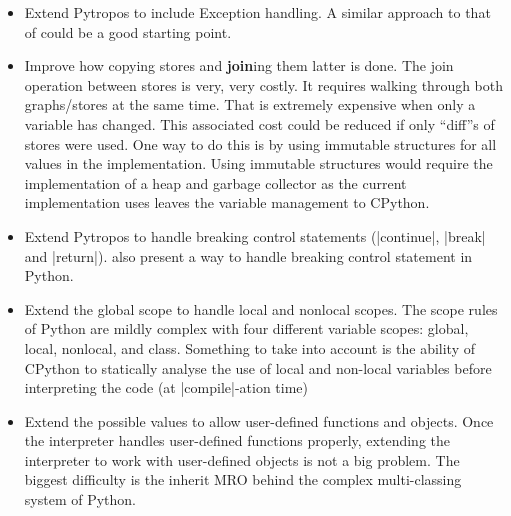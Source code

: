 \begin{itemize}
\tightlist
\item Extend Pytropos to include Exception handling. A similar approach to that of
  \textcite{fromherz_static_2018} could be a good starting point.
\item Improve how copying stores and \textbf{join}ing them latter is done. The join
  operation between stores is very, very costly. It requires walking through both
  graphs/stores at the same time. That is extremely expensive when only a variable has
  changed. This associated cost could be reduced if only \enquote{diff}s of stores were
  used.  One way to do this is by using immutable structures for all values in the
  implementation. Using immutable structures would require the implementation of a heap
  and garbage collector as the current implementation uses leaves the variable management
  to CPython.
\item Extend Pytropos to handle breaking control statements (\pycode|continue|,
  \pycode|break| and \pycode|return|). \textcite{fromherz_static_2018} also present a way
  to handle breaking control statement in Python.
\item Extend the global scope to handle local and nonlocal scopes. The scope rules of
  Python are mildly complex with four different variable scopes: global, local, nonlocal,
  and class. Something to take into account is the ability of CPython to statically
  analyse the use of local and non-local variables before interpreting the code (at
  \pycode|compile|-ation time)
\item Extend the possible values to allow user-defined functions and objects.  Once the
  interpreter handles user-defined functions properly, extending the interpreter to work
  with user-defined objects is not a big problem. The biggest difficulty is the inherit
  MRO behind the complex multi-classing system of Python.
\end{itemize}


